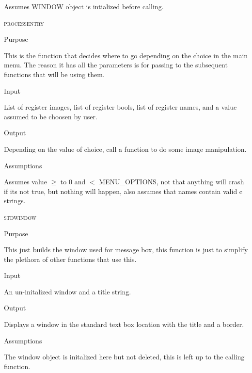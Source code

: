 \documentclass[pdftex, 11pt]{article}
\begin{document}
\begin{description}
\begin{description}
				Assumes WINDOW object is intialized before calling.


		\end{description}


	\item{\textsc{processentry}}
		\begin{description}
			\item{Purpose}

				This is the function that decides where to go depending on the choice in the
				main menu.  The reason it has all the parameters is for passing to the
				subsequent functions that will be using them.

			\item{Input}

				List of register images, list of register bools, list of
				register names, and a value assumed to be choosen by user.


			\item{Output}

				Depending on the value of choice, call a function to do some image
				manipulation.

			\item{Assumptions}

				Assumes value $\geq$ to 0 and $<$ MENU\_OPTIONS, not that anything
				will crash if its not true, but nothing will happen, also
				assumes that names contain valid c strings.

		\end{description}



	\item{\textsc{stdwindow}}
		\begin{description}
			\item{Purpose}

				This just builds the window used for message box, this function is just to
				simplify the plethora of other functions that use this.
				
			\item{Input}
				
				An un-initalized window and a title string.

			\item{Output}

				Displays a window in the standard text box location with
				the title and a border.

			\item{Assumptions}

				The window object is initalized here but not deleted, this
				is left up to the calling function.



\end{description}
\end{description}
\end{document}
